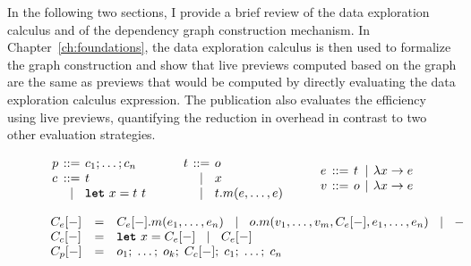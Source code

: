 \documentclass[fleqn,11pt]{report}
\newcommand{\lsep}[0]{\;\; | \;\;}
\newcommand{\kvd}[1]{\textnormal{\ttfamily\bfseries #1}}
\newcommand{\narrow}[1]{\hspace{-0.6em}#1\hspace{-0.6em}}
\theoremstyle{definition}
\begin{document}
In the following two sections, I provide a brief review of the data exploration calculus and of
the dependency graph construction mechanism. In Chapter~\ref{ch:foundations}, the data exploration
calculus is then used to formalize the graph construction and show that live previews computed
based on the graph are the same as previews that would be computed by directly evaluating the
data exploration calculus expression. The publication also evaluates the efficiency using live
previews, quantifying the reduction in overhead in contrast to two other evaluation strategies.

\begin{figure}
\raggedright
\hspace{0.5em}{\sffamily Programs, commands, terms, expressions and values}
%
\begin{equation*}
\begin{array}{lcl}
p &\narrow{::=}& c_1; \ldots; c_n\\
c &\narrow{::=}& t\\
  &\narrow{|}& \kvd{let}~x = t~t\\
\end{array}
\qquad
\begin{array}{lcl}
t &\narrow{::=}& o \\
  &\narrow{|}& x\\
  &\narrow{|}& t.m(e, \ldots, e)
\end{array}
\qquad
\begin{array}{lclcl}
e &\narrow{::=}& t &\narrow{|}& \lambda x\rightarrow e\\
v &\narrow{::=}& o &\narrow{|}& \lambda x\rightarrow e\\
\end{array}
\end{equation*}

%
\hspace{0.5em}{\sffamily Evaluation contexts of expressions}
%
\begin{equation*}
\begin{array}{lcl}
C_e[-] &=& C_e[-].m(e_1, \ldots, e_n) ~\lsep~ o.m(v_1, \ldots, v_{m}, C_e[-], e_1,\ldots , e_n) ~\lsep~ -\\
C_c[-] &=& \kvd{let}~x = C_e[-] ~\lsep~ C_e[-]\\
C_p[-] &=& o_1;\; \ldots;\; o_{k};\; C_c[-];\; c_{1};\; \ldots;\; c_n\\
\end{array}
\end{equation*}


\end{figure}
\end{document}
